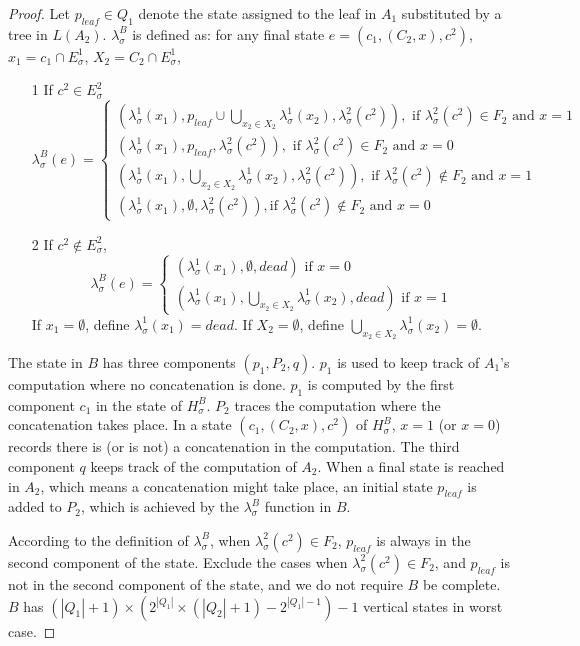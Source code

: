 \documentclass[copyright]{eptcs}
\begin{document}
\begin{proof}
Let $p_{leaf}\in Q_1$ denote the state assigned to the leaf in
$A_1$ substituted by a tree in $L(A_2)$. $\lambda_\sigma^{B}$ is
defined as: for any final state $e = ( c_1 , ( C_2 , x) ,c^2)$,
$x_1 = c_1 \cap E_\sigma^1$, $X_2 = C_2 \cap E_\sigma^1$,
\begin{itemize}
  \item[1] If $c^2 \in E_\sigma^2$
$$
\lambda_\sigma^{B}(e) = \left\{
\begin{array}{l}
 ( \lambda_\sigma^1 (x_1) ,  p_{leaf} \cup \bigcup_{x_2\in X_2}\lambda_\sigma^1 (x_2) , \lambda_\sigma^2 (c^2) ), \mbox{ if }
\lambda_\sigma^2 (c^2) \in F_2 \mbox{ and } x=1
 \\
  ( \lambda_\sigma^1 (x_1) ,  p_{leaf} , \lambda_\sigma^2 (c^2) ),
\mbox{ if } \lambda_\sigma^2 (c^2) \in F_2 \mbox{ and } x=0
 \\
(\lambda_\sigma^1 (x_1) , \bigcup_{x_2\in X_2} \lambda_\sigma^1
(x_2) ,\lambda_\sigma^2 (c^2) ), \mbox{ if } \lambda_\sigma^2
(c^2) \notin F_2 \mbox{ and } x=1
 \\
 ( \lambda_\sigma^1 (x_1) , \emptyset , \lambda_\sigma^2 (c^2) ), \mbox{
if } \lambda_\sigma^2 (c^2) \notin F_2 \mbox{ and } x=0
\end{array} \right.
$$
\item[2] If $c^2 \notin E_{\sigma}^2$,
$$
\lambda_\sigma^{B}(e) = \left\{
\begin{array}{l}
( \lambda_\sigma^1 (x_1) , \emptyset , dead ) \mbox{ if } x = 0
 \\
( \lambda_\sigma^1 (x_1) , \bigcup_{x_2\in X_2} \lambda_\sigma^1
(x_2) ,dead ) \mbox{ if } x=1
\end{array} \right.
$$
If $x_1 = \emptyset$, define $ \lambda_\sigma^1 (x_1) = dead $. If
$X_2 = \emptyset$, define $\bigcup_{x_2\in X_2} \lambda_\sigma^1
(x_2) = \emptyset$.
\end{itemize}
The state in $B$ has three components $( p_1 , P_2 ,q)$. $p_1$ is
used to keep track of $A_1$'s computation where no concatenation
is done. $p_1$ is computed by the first component $c_1$ in the
state of $H_{\sigma}^{B}$. $P_2$ traces the computation where the
concatenation takes place. In a state $( c_1 , ( C_2 , x) ,c^2)$
of $H_{\sigma}^{B}$, $x=1$ (or $x=0$) records there is (or is not)
a concatenation in the computation. The third component $q$ keeps
track of the computation of $A_2$. When a final state is reached
in $A_2$, which means a concatenation might take place, an initial
state $p_{leaf}$ is added to $P_2$, which is achieved by the
$\lambda_\sigma^{B}$ function in $B$.

According to the definition of $\lambda_\sigma^{B}$, when
$\lambda_\sigma^2 (c^2) \in F_2$, $p_{leaf}$ is always in the
second component of the state. Exclude the cases when
$\lambda_\sigma^2 (c^2) \in F_2$, and $p_{leaf}$ is not in the
second component of the state, and we do not require $B$ be
complete. $B$ has $(|Q_1| + 1)\times (2^{|Q_1|} \times
(|Q_2|+1)-2^{|Q_1|-1})-1$ vertical states in worst case.
\end{proof}
\endpf
\end{document}
